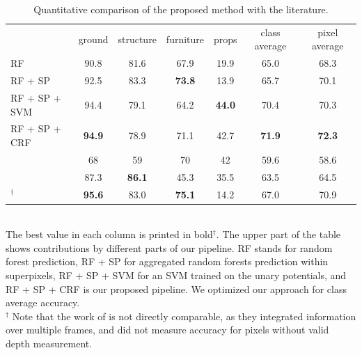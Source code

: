 \begin{table}[t]
    \caption{Quantitative comparison of the proposed method with the
    literature.}
\begin{tabularx}{\linewidth}{@{\extracolsep{\fill}}lcccccc}
\toprule
                        & ground        &  structure    & furniture     & props         & class average   & pixel average\\
\cmidrule(r){1-7}

RF                              &         90.8  &   81.6        & 67.9          & 19.9          &  65.0        &  68.3 \\
RF + SP                         &         92.5  &   83.3        & \textbf{73.8} & 13.9          &  65.7        &  70.1 \\ 
RF + SP + SVM                   &         94.4  &   79.1        & 64.2          & \textbf{44.0} &  70.4        &  70.3 \\
RF + SP + CRF                   & \textbf{94.9} &   78.9        &          71.1 & 42.7          &\textbf{71.9} &  \textbf{72.3} \\
\cmidrule(r){1-7}
\citet{SilbermanECCV12}         &         68    &   59          & 70           & 42            &  59.6        & 58.6 \\
\citet{couprie-iclr-13}         &         87.3  & \textbf{86.1} & 45.3         & 35.5          &  63.5        & 64.5 \\
\cmidrule(r){1-7}
\citet{stueckler2013}$^\dagger$ & \textbf{95.6} &   83.0        & \textbf{75.1}& 14.2          &  67.0        & 70.9 \\

\bottomrule
\end{tabularx}
\quad\\The best value in each column is printed in bold$^\dagger$. The upper part of
the table shows contributions by different parts of our pipeline. RF stands for random forest prediction, RF + SP for aggregated
random forests prediction within superpixels, RF + SP + SVM for an SVM trained on the unary potentials, and RF + SP + CRF is
our proposed pipeline. We optimized our approach for class average
accuracy.\\
$^\dagger$ \footnotesize Note that the work of \citet{stueckler2013} is not directly
comparable, as they integrated information over multiple frames, and did not
measure accuracy for pixels without valid depth measurement.
\vspace{-5mm}
\end{table}

